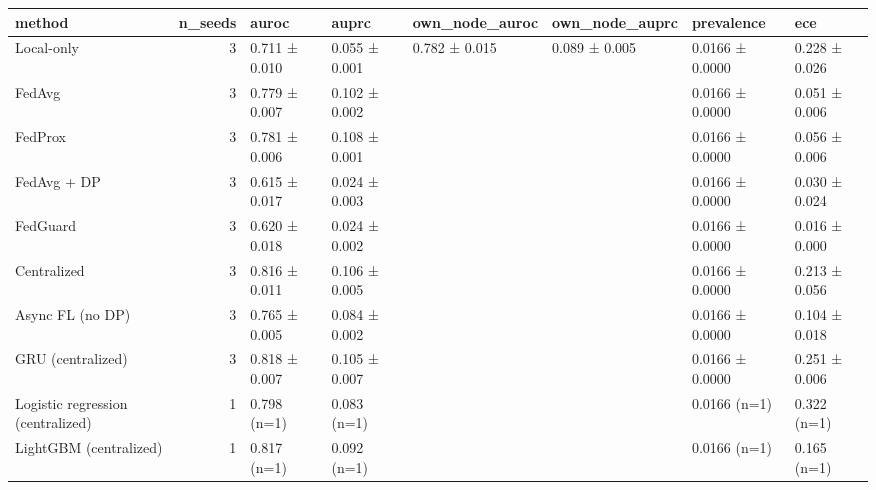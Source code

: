\begin{tabular}{lrllllll}
\toprule
method & n\_seeds & auroc & auprc & own\_node\_auroc & own\_node\_auprc & prevalence & ece \\
\midrule
Local-only & 3 & 0.711 ± 0.010 & 0.055 ± 0.001 & 0.782 ± 0.015 & 0.089 ± 0.005 & 0.0166 ± 0.0000 & 0.228 ± 0.026 \\
FedAvg & 3 & 0.779 ± 0.007 & 0.102 ± 0.002 &  &  & 0.0166 ± 0.0000 & 0.051 ± 0.006 \\
FedProx & 3 & 0.781 ± 0.006 & 0.108 ± 0.001 &  &  & 0.0166 ± 0.0000 & 0.056 ± 0.006 \\
FedAvg + DP & 3 & 0.615 ± 0.017 & 0.024 ± 0.003 &  &  & 0.0166 ± 0.0000 & 0.030 ± 0.024 \\
FedGuard & 3 & 0.620 ± 0.018 & 0.024 ± 0.002 &  &  & 0.0166 ± 0.0000 & 0.016 ± 0.000 \\
Centralized & 3 & 0.816 ± 0.011 & 0.106 ± 0.005 &  &  & 0.0166 ± 0.0000 & 0.213 ± 0.056 \\
Async FL (no DP) & 3 & 0.765 ± 0.005 & 0.084 ± 0.002 &  &  & 0.0166 ± 0.0000 & 0.104 ± 0.018 \\
GRU (centralized) & 3 & 0.818 ± 0.007 & 0.105 ± 0.007 &  &  & 0.0166 ± 0.0000 & 0.251 ± 0.006 \\
Logistic regression (centralized) & 1 & 0.798 (n=1) & 0.083 (n=1) &  &  & 0.0166 (n=1) & 0.322 (n=1) \\
LightGBM (centralized) & 1 & 0.817 (n=1) & 0.092 (n=1) &  &  & 0.0166 (n=1) & 0.165 (n=1) \\
\bottomrule
\end{tabular}
